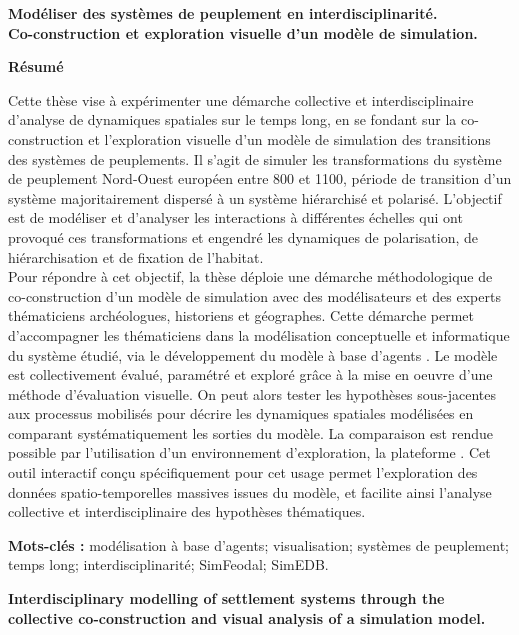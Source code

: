 {\large\textbf{Modéliser des systèmes de peuplement en interdisciplinarité.\\ Co-construction et exploration visuelle d'un modèle de simulation.}}

\textbf{Résumé}

\vspace*{-0.5em}
Cette thèse vise à expérimenter une démarche collective et interdisciplinaire d'analyse de dynamiques spatiales sur le temps long, en se fondant sur la co-construction et l'exploration visuelle d'un modèle de simulation des transitions des systèmes de peuplements.
Il s'agit de simuler les transformations du système de peuplement Nord-Ouest européen entre 800 et 1100, période de transition d'un système majoritairement dispersé à un système hiérarchisé et polarisé.
L'objectif est de modéliser et d'analyser les interactions à différentes échelles qui ont provoqué ces transformations et engendré les dynamiques de polarisation, de hiérarchisation et de fixation de l'habitat.\\
Pour répondre à cet objectif, la thèse déploie une démarche méthodologique de co-construction d'un modèle de simulation avec des modélisateurs et des experts thématiciens archéologues, historiens et géographes.
Cette démarche permet d'accompagner les thématiciens dans la modélisation conceptuelle et informatique du système étudié, via le développement du modèle à base d'agents \simfeodal{}.
Le modèle est collectivement évalué, paramétré et exploré grâce à la mise en oeuvre d'une méthode d'évaluation visuelle.
On peut alors tester les hypothèses sous-jacentes aux processus mobilisés pour décrire les dynamiques spatiales modélisées en comparant systématiquement les sorties du modèle.
La comparaison est rendue possible par l'utilisation d'un environnement d'exploration, la plateforme \simedb{}.
Cet outil interactif conçu spécifiquement pour cet usage permet l'exploration des données spatio-temporelles massives issues du modèle, et facilite ainsi l'analyse collective et interdisciplinaire des hypothèses thématiques.

\textbf{Mots-clés :} 
modélisation à base d'agents; visualisation; systèmes de peuplement; temps long; interdisciplinarité; SimFeodal; SimEDB.

\vspace{1.2em}
{\large\textbf{Interdisciplinary modelling of settlement systems through the collective co-construction and visual analysis of a simulation model.}}

